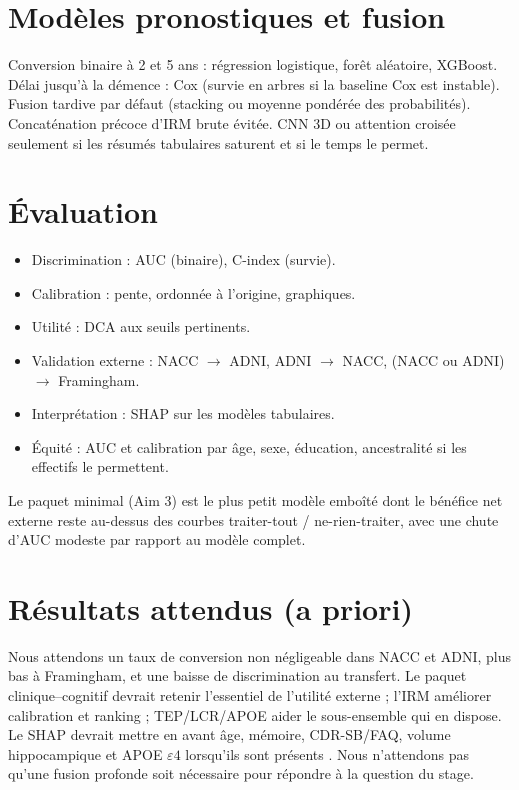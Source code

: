 \section{Modèles pronostiques et fusion}

Conversion binaire à 2 et 5 ans : régression logistique, forêt aléatoire, XGBoost. Délai jusqu'à la démence : Cox (survie en arbres si la baseline Cox est instable). Fusion tardive par défaut (stacking ou moyenne pondérée des probabilités). Concaténation précoce d'IRM brute évitée. CNN 3D ou attention croisée seulement si les résumés tabulaires saturent et si le temps le permet.

\section{Évaluation}

\begin{itemize}[label=, font=\large \color{darkorange}]
\item Discrimination : AUC (binaire), C-index (survie).
\item Calibration : pente, ordonnée à l'origine, graphiques.
\item Utilité : \ac{DCA} aux seuils pertinents.
\item Validation externe : NACC $\rightarrow$ ADNI, ADNI $\rightarrow$ NACC, (NACC ou ADNI) $\rightarrow$ Framingham.
\item Interprétation : \ac{SHAP} sur les modèles tabulaires.
\item Équité : AUC et calibration par âge, sexe, éducation, ancestralité si les effectifs le permettent.
\end{itemize}

Le paquet minimal (Aim 3) est le plus petit modèle emboîté dont le bénéfice net externe reste au-dessus des courbes traiter-tout / ne-rien-traiter, avec une chute d'AUC modeste par rapport au modèle complet.

\section{Résultats attendus (a priori)}

Nous attendons un taux de conversion non négligeable dans NACC et ADNI, plus bas à Framingham, et une baisse de discrimination au transfert. Le paquet clinique--cognitif devrait retenir l'essentiel de l'utilité externe ; l'IRM améliorer calibration et ranking ; TEP/LCR/APOE aider le sous-ensemble qui en dispose. Le \ac{SHAP} devrait mettre en avant âge, mémoire, CDR-SB/FAQ, volume hippocampique et APOE $\varepsilon 4$ lorsqu'ils sont présents \cite{chun2022shap,xue2024natmed}. Nous n'attendons pas qu'une fusion profonde soit nécessaire pour répondre à la question du stage.
